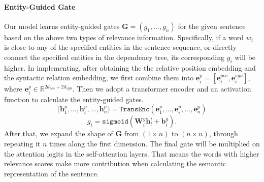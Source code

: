\documentclass[11pt]{article}
\begin{document}
\paragraph{Entity-Guided Gate}
Our model learns entity-guided gates $\bm G = (g_1,...,g_n)$ for the given sentence based on the above two types of relevance information.
Specifically, if a word $w_i$  is close to any of the specified entities in the sentence sequence, or directly connect the  specified entities in the dependency tree, its corresponding $g_i$ will be higher. In implementing, 
after obtaining the the relative position embedding and the syntactic relation embedding, we first combine them into $\bm e_i^p=[\bm e_i^{pos}, \bm e_i^{syn}]$, where $\bm e_i^p \in \mathbb{R}^{2d_{pos}+2d_{syn}}$. Then we adopt a transformer encoder \cite{46201} and an activation function to calculate the entity-guided gates.
\begin{equation}
\bm (\bm h^p_{1},...,\bm h^p_{i},...,\bm h^p_{n}) = \mathtt{TransEnc}(\bm e^p_{1},...,\bm e^p_{i},...,\bm e^p_{n})
\end{equation}
\begin{equation}
g_i = \mathtt{sigmoid}(\bm W_i^g \bm h_t^i + \bm b_i^g).
\end{equation}
After that, we expand the shape of $\bm G$ from $(1\times n)$ to $(n \times n)$, through repeating it $n$ times along the first dimension. The final gate will be multiplied on the attention logits in the self-attention layers.  That means the words with higher relevance scores make more contribution when calculating the semantic representation of the sentence. 
\end{document}
